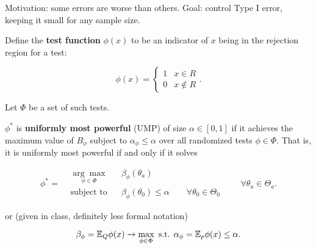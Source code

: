 Motivation: some errors are worse than others. Goal: control Type I error, keeping it small for any sample size. 

Define the \textbf{test function} \(\phi(x)\) to be an indicator of \(x\) being in the rejection region for a test:

\[
\phi(x) = \begin{cases}
1 & x \in R \\
0 & x \notin R
\end{cases}.
\]

Let \(\Phi\) be a set of such tests.

\begin{definition}

\(\phi^*\) is \textbf{uniformly most powerful} (UMP) of size \(\alpha \in [0,1]\) if it achieves the maximum value of \(B_\phi\) subject to \(\alpha_\phi \leq \alpha\) over all randomized tests \(\phi \in \Phi\). That is, it is uniformly most powerful if and only if it solves

\[
\phi^* = \begin{aligned}
& \underset{\phi \in \Phi}{\arg \max}
& & \beta_\phi(\theta_a) \\
& \text{subject to}
& & \beta_\phi(\theta_0) \leq \alpha \qquad \forall \theta_0 \in \Theta_0
\end{aligned} \qquad \forall \theta_a \in \Theta_a.
\]



or (given in class, definitely less formal notation)

\[
\beta_\phi = \E_Q \phi(x) \to \max_{\phi \in \Phi} \text{ s.t. } \alpha_\phi = \E_p \phi(x) \leq \alpha.
\]


\end{definition}



